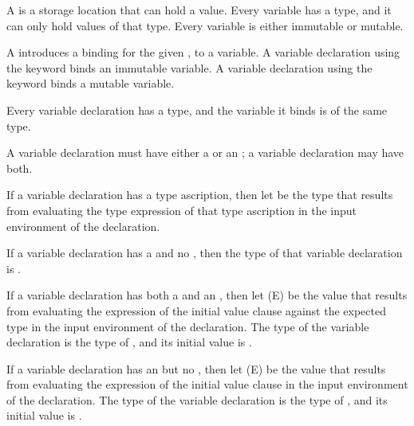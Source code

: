 A  is a storage location that can hold a value.
Every variable has a type, and it can only hold values of that type.
Every variable is either immutable or mutable.

A  introduces a binding for the given , to a variable.
A variable declaration using the  keyword binds an immutable variable.
A variable declaration using the  keyword binds a mutable variable.

Every variable declaration has a type, and the variable it binds is of the same type.

A variable declaration must have either a  or an ; a variable declaration may have both.

If a variable declaration has a type ascription, then let  be the type that results from evaluating the type expression of that type ascription in the input environment of the declaration.

If a variable declaration has a  and no , then the type of that variable declaration is .

If a variable declaration has both a  and an , then let \MetaVar(E) be the value that results from evaluating the expression of the initial value clause against the expected type  in the input environment of the declaration.
The type of the variable declaration is the type of , and its initial value is .

If a variable declaration has an  but no , then let \MetaVar(E) be the value that results from evaluating the expression of the initial value clause in the input environment of the declaration.
The type of the variable declaration is the type of , and its initial value is .

